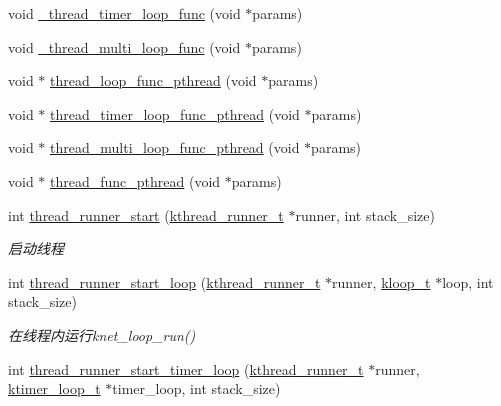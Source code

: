 \begin{DoxyCompactItemize}
void \hyperlink{a00099_af3540c31c89a280433080939f96da861_af3540c31c89a280433080939f96da861}{\+\_\+thread\+\_\+timer\+\_\+loop\+\_\+func} (void $\ast$params)
\item 
void \hyperlink{a00099_af85e5a51f4ff2866c5db552529646165_af85e5a51f4ff2866c5db552529646165}{\+\_\+thread\+\_\+multi\+\_\+loop\+\_\+func} (void $\ast$params)
\item 
void $\ast$ \hyperlink{a00099_a4f94afc82ab1358bdfdaa1739ca71655_a4f94afc82ab1358bdfdaa1739ca71655}{thread\+\_\+loop\+\_\+func\+\_\+pthread} (void $\ast$params)
\item 
void $\ast$ \hyperlink{a00099_a878593e36d665dc3334cf71e88bf93e6_a878593e36d665dc3334cf71e88bf93e6}{thread\+\_\+timer\+\_\+loop\+\_\+func\+\_\+pthread} (void $\ast$params)
\item 
void $\ast$ \hyperlink{a00099_acd0090cfcdc1ccc4cc778a0a70d20e57_acd0090cfcdc1ccc4cc778a0a70d20e57}{thread\+\_\+multi\+\_\+loop\+\_\+func\+\_\+pthread} (void $\ast$params)
\item 
void $\ast$ \hyperlink{a00099_a75b9d7e4a1d3734e2a4c0ba298b1578c_a75b9d7e4a1d3734e2a4c0ba298b1578c}{thread\+\_\+func\+\_\+pthread} (void $\ast$params)
\item 
int \hyperlink{a00138_gae125061eb96b154766c0a414eb74065c_gae125061eb96b154766c0a414eb74065c}{thread\+\_\+runner\+\_\+start} (\hyperlink{a00066_a4f78c259c9527c821f1a6f87495dd339_a4f78c259c9527c821f1a6f87495dd339}{kthread\+\_\+runner\+\_\+t} $\ast$runner, int stack\+\_\+size)
\begin{DoxyCompactList}\small\item\em 启动线程 \end{DoxyCompactList}\item 
int \hyperlink{a00138_ga4328cb11f2446f4da89374a1ae8a2f8e_ga4328cb11f2446f4da89374a1ae8a2f8e}{thread\+\_\+runner\+\_\+start\+\_\+loop} (\hyperlink{a00066_a4f78c259c9527c821f1a6f87495dd339_a4f78c259c9527c821f1a6f87495dd339}{kthread\+\_\+runner\+\_\+t} $\ast$runner, \hyperlink{a00066_a97fc76209a58362019f1ded9169e397f_a97fc76209a58362019f1ded9169e397f}{kloop\+\_\+t} $\ast$loop, int stack\+\_\+size)
\begin{DoxyCompactList}\small\item\em 在线程内运行knet\+\_\+loop\+\_\+run() \end{DoxyCompactList}\item 
int \hyperlink{a00138_ga943c1e0bc78abe3d7faae24ae3670d9a_ga943c1e0bc78abe3d7faae24ae3670d9a}{thread\+\_\+runner\+\_\+start\+\_\+timer\+\_\+loop} (\hyperlink{a00066_a4f78c259c9527c821f1a6f87495dd339_a4f78c259c9527c821f1a6f87495dd339}{kthread\+\_\+runner\+\_\+t} $\ast$runner, \hyperlink{a00066_a024af2aa29615e7a811ea6c45438157d_a024af2aa29615e7a811ea6c45438157d}{ktimer\+\_\+loop\+\_\+t} $\ast$timer\+\_\+loop, int stack\+\_\+size)

\end{DoxyCompactItemize}
